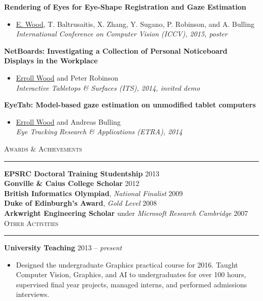 \documentclass{article}
\begin{document}
\textbf{Rendering of Eyes for Eye-Shape Registration and Gaze Estimation} \\[-6mm]
\begin{itemize}
  \item[] \underline{E. Wood}, T. Baltrusaitis, X. Zhang, Y. Sugano, P. Robinson, and A. Bulling \\
  \emph{International Conference on Computer Vision (ICCV), 2015, poster}
\end{itemize} \smallskip

\textbf{NetBoards: Investigating a Collection of Personal Noticeboard Displays in the Workplace} \\[-6mm]
\begin{itemize}
  \item[] \underline{Erroll Wood} and Peter Robinson \\
  \emph{Interactive Tabletops \& Surfaces (ITS), 2014, invited demo}
\end{itemize} \smallskip

\textbf{EyeTab: Model-based gaze estimation on unmodified tablet computers} \\[-6mm]
\begin{itemize}
  \item[] \underline{Erroll Wood} and Andreas Bulling \\
  \emph{Eye Tracking Research \& Applications (ETRA), 2014}
\end{itemize} \bigskip

\textsc{Awards \& Achievements} \smallskip \hrule \smallskip

\textbf{EPSRC Doctoral Training Studentship} \hfill 2013 \\[+1mm]
\textbf{Gonville \& Caius College Scholar} \hfill 2012 \\[+1mm]
\textbf{British Informatics Olympiad}, \emph{National Finalist} \hfill 2009 \\[+1mm]
\textbf{Duke of Edinburgh's Award}, \emph{Gold Level} \hfill 2008 \\[+1mm]
\textbf{Arkwright Engineering Scholar} under \emph{Microsoft Research Cambridge} \hfill 2007 \\

\textsc{Other Activities} \smallskip \hrule \smallskip

\textbf{University Teaching} \hfill 2013 -- \emph{present} \\[-6mm]
\begin{itemize}
  \item[]
  Designed the undergraduate Graphics practical course for 2016.
  Taught Computer Vision, Graphics, and AI to undergraduates for over 100 hours, supervised final year projects, managed interns, and performed admissions interviews.
\end{itemize} \smallskip
\end{document}
